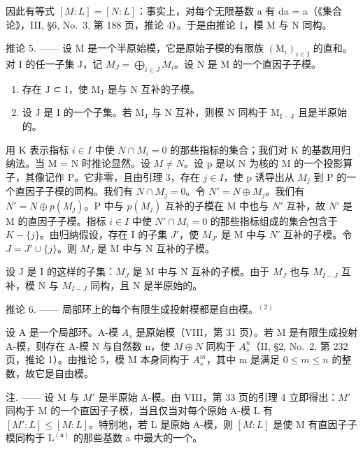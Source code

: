 因此有等式 \([M:L]=[N:L]\)：事实上，对每个无限基数 a 有 da = a（《集合论》，III, §6, No.~3, 第 188 页，推论 4）。于是由推论 1，模 M 与 N 同构。

推论 5. —— 设 M 是一个半原始模，它是原始子模的有限族 \((\mathrm{M}_{i})_{i\in\mathrm{I}}\) 的直和。对 I 的任一子集 J，记 \(M_{J}=\bigoplus_{i\in J}M_{i}\)。设 N 是 M 的一个直因子子模。

\begin{enumerate}
\def\labelenumi{\alph{enumi})}
\item
  存在 \(\mathrm{J}\) ⊂ \(\mathrm{I}\)，使 \(\mathrm{M}_{\mathrm{J}}\) 是与 \(\mathrm{N}\) 互补的子模。
\item
  设 \(\mathrm{J}\) 是 \(\mathrm{I}\) 的一个子集。若 \(\mathrm{M}_{\mathrm{J}}\) 与 \(\mathrm{N}\) 互补，则模 \(\mathrm{N}\) 同构于 \(\mathrm{M}_{\mathrm{I - J}}\) 且是半原始的。
\end{enumerate}

用 K 表示指标 \(i \in I\) 中使 \(N \cap M_{i} = 0\) 的那些指标的集合；我们对 K 的基数用归纳法。当 M = N 时推论显然。设 \(M \neq N\)。设 p 是以 N 为核的 M 的一个投影算子，其像记作 P。它非零，且由引理 3，存在 \(j \in I\)，使 p 诱导出从 \(M_{j}\) 到 P 的一个直因子子模的同构。我们有 \(N \cap M_{j} = 0\)。令 \(N' = N \oplus M_{j}\)。我们有 \(N' = N \oplus p(M_{j})\)。P 中与 \(p(M_{j})\) 互补的子模在 M 中也与 \(N'\) 互补，故 \(N'\) 是 M 的直因子子模。指标 \(i \in I\) 中使 \(N' \cap M_{i} = 0\) 的那些指标组成的集合包含于 \(K - \{j\}\)。由归纳假设，存在 I 的子集 \(J'\)，使 \(M_{J'}\) 是 M 中与 \(N'\) 互补的子模。令 \(J = J' \cup \{j\}\)。则 \(M_{J}\) 是 M 中与 N 互补的子模。

设 J 是 I 的这样的子集：\(M_{J}\) 是 M 中与 N 互补的子模。由于 \(M_{J}\) 也与 \(M_{I-J}\) 互补，模 N 与 \(M_{I-J}\) 同构，且 N 是半原始的。

推论 6. —— 局部环上的每个有限生成投射模都是自由模。\(^{(2)}\)

设 A 是一个局部环。A-模 \(A_{s}\) 是原始模（VIII，第 31 页）。若 M 是有限生成投射 A-模，则存在 A-模 N 与自然数 n，使 \(M \oplus N\) 同构于 \(A_{s}^{n}\)（II, §2, No.~2, 第 232 页，推论 1）。由推论 5，模 M 本身同构于 \(A_{s}^{m}\)，其中 m 是满足 \(0 \leqslant m \leqslant n\) 的整数，故它是自由模。

注. —— 设 M 与 \(M'\) 是半原始 A-模。由 VIII，第 33 页的引理 4 立即得出：\(M'\) 同构于 M 的一个直因子子模，当且仅当对每个原始 A-模 L 有 \([M':L] \leqslant [M:L]\)。特别地，若 L 是原始 A-模，则 \([M:L]\) 是使 M 有直因子子模同构于 \(\mathrm{L}^{(\mathfrak{a})}\) 的那些基数 a 中最大的一个。

